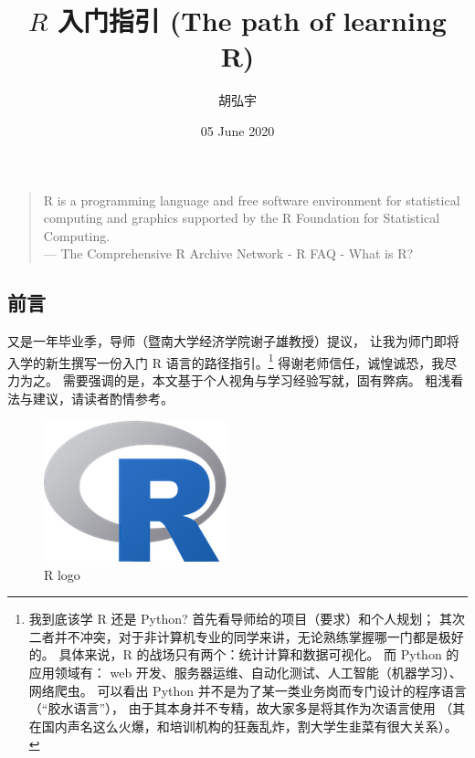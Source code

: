 \documentclass[11pt,hyperref]{ctexart}
\title{\(R\) 入门指引 (The path of learning R)\\\vspace{0.5em}{\large \url{https://github.com/jun3970/R-Intro}}}
\author{胡弘宇}
\date{05 June 2020}
\begin{document}
\maketitle

\begin{quote}
R is a programming language and free software environment for
statistical computing and graphics supported by the R Foundation for
Statistical Computing.\\
--- The Comprehensive R Archive Network - R FAQ - What is R?
\end{quote}

\hypertarget{ux524dux8a00}{%
\subsection{前言}\label{ux524dux8a00}}

又是一年毕业季，导师（暨南大学经济学院谢子雄教授）提议，
让我为师门即将入学的新生撰写一份入门 R 语言的路径指引。\footnote{我到底该学
  R 还是 Python? 首先看导师给的项目（要求）和个人规划；
  其次二者并不冲突，对于非计算机专业的同学来讲，无论熟练掌握哪一门都是极好的。
  具体来说，R 的战场只有两个：统计计算和数据可视化。 而 Python
  的应用领域有： web
  开发、服务器运维、自动化测试、人工智能（机器学习）、网络爬虫。
  可以看出 Python
  并不是为了某一类业务岗而专门设计的程序语言（``胶水语言''），
  由于其本身并不专精，故大家多是将其作为次语言使用
  （其在国内声名这么火爆，和培训机构的狂轰乱炸，割大学生韭菜有很大关系）。}
得谢老师信任，诚惶诚恐，我尽力为之。
需要强调的是，本文基于个人视角与学习经验写就，固有弊病。
粗浅看法与建议，请读者酌情参考。

\begin{figure}
\centering
\includegraphics{images/R-logo.png}
\caption{R logo}
\end{figure}
\end{document}

